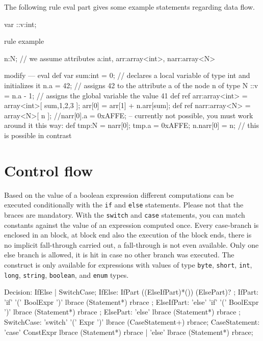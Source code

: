 \begin{example}
The following rule eval part gives some example statements regarding data flow.
  \begin{grgen}
var ::v:int;
	
rule example
{
  n:N; // we assume attributes a:int, arr:array<int>, narr:array<N>
	
	modify {
	---
		eval {
			def var sum:int = 0; // declares a local variable of type int and initializes it
			n.a = 42; // assigns 42 to the attribute a of the node n of type N
			::v = n.a - 1; // assigns the global variable the value 41
			def ref arr:array<int> = array<int>[ sum,1,2,3 ];
			arr[0] = arr[1] + n.arr[sum];
			def ref narr:array<N> = array<N>[ n ];
			//narr[0].a = 0xAFFE; -- currently not possible, you must work around it this way:
			def tmp:N = narr[0];
			tmp.a = 0xAFFE;
			n.narr[0] = n; // this is possible in contrast
		}
	}
}
  \end{grgen}
\end{example}


\section{Control flow} \label{sub:controlflow}

Based on the value of a boolean expression different computations can be executed conditionally with the \texttt{if} and \texttt{else} statements. 
Please not that the braces are mandatory.
With the \texttt{switch} and \texttt{case} statements, you can match constants against the value of an expression computed once.
Every case-branch is enclosed in an block, at block end also the execution of the block ends,
there is no implicit fall-through carried out, a fall-through is not even available.
Only one else branch is allowed, it is hit in case no other branch was executed.
The construct is only available for expressions with values of type \texttt{byte}, \texttt{short}, \texttt{int}, \texttt{long}, \texttt{string}, \texttt{boolean}, and \texttt{enum} types.

\begin{rail} 
  Decision: IfElse | SwitchCase;
  IfElse: IfPart ((ElseIfPart)*()) (ElsePart)? ;
	IfPart: 'if' '(' BoolExpr ')' lbrace (Statement*) rbrace ;
	ElseIfPart: 'else' 'if' '(' BoolExpr ')' lbrace (Statement*) rbrace ;
	ElsePart: 'else' lbrace (Statement*) rbrace ;
	SwitchCase: 'switch' '(' Expr ')' lbrace (CaseStatement+) rbrace;
	CaseStatement: 'case' ConstExpr lbrace (Statement*) rbrace | 'else' lbrace (Statement*) rbrace;
\end{rail}

